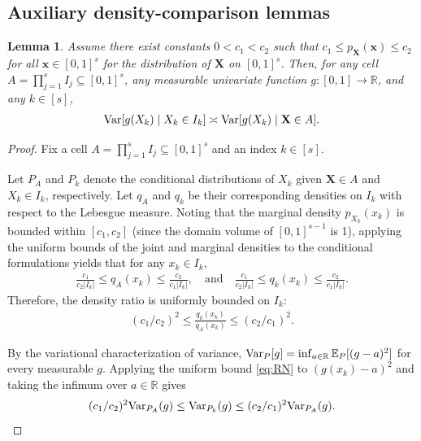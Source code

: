 \documentclass[11pt]{article}
\theoremstyle{plain}
\newtheorem{lemma}[theorem]{Lemma}
\theoremstyle{definition}
\theoremstyle{remark}
\theoremstyle{plain}
\newcommand{\bx}{\mathbf{x}}
\newcommand{\bX}{\mathbf{X}}
\DeclarePairedDelimiter{\bracks}{[}{]}
\newcommand{\E}{\mathbb{E}}
\newcommand{\Var}{\textnormal{Var}}
\newcommand{\1}{\mathbbm{1}}
\begin{document}
\subsection{Auxiliary density-comparison lemmas}

\begin{lemma}\label{lemma:equiv-proj-var}
    Assume there exist constants $0 < c_1 < c_2$ such that $c_1 \leq p_{\bX}(\bx) \leq c_2$ for all $\bx \in [0,1]^s$ for the distribution of $\bX$ on $[0,1]^s$.
    Then, for any cell $A = \prod_{j=1}^s I_j \subseteq [0,1]^s$, any measurable univariate function $g : [0,1] \to \mathbb{R}$, and any $k \in [s]$,
    \begin{equation}
    \begin{aligned}
        \Var\bracks*{g(X_k) \mid X_k \in I_k} \asymp \Var\bracks*{g(X_k) \mid \bX \in A}.
    \end{aligned}
    \end{equation}
\end{lemma}

\begin{proof}
    Fix a cell $A = \prod_{j=1}^s I_j \subseteq [0,1]^s$ and an index $k \in [s]$.

    Let $P_A$ and $P_k$ denote the conditional distributions of $X_k$ given $\bX \in A$ and $X_k \in I_k$, respectively. Let $q_A$ and $q_k$ be their corresponding densities on $I_k$ with respect to the Lebesgue measure. Noting that the marginal density $p_{X_k}(x_k)$ is bounded within $[c_1, c_2]$ (since the domain volume of $[0,1]^{s-1}$ is 1), applying the uniform bounds of the joint and marginal densities to the conditional formulations yields that for any $x_k \in I_k$,
    \begin{equation}
    \begin{aligned}
        \frac{c_1}{c_2 |I_k|} \leq q_A(x_k) \leq \frac{c_2}{c_1 |I_k|}, \quad \text{and} \quad \frac{c_1}{c_2 |I_k|} \leq q_k(x_k) \leq \frac{c_2}{c_1 |I_k|}.
    \end{aligned}
    \end{equation}
    Therefore, the density ratio is uniformly bounded on $I_k$:
    \begin{equation}\label{eq:RN}
    \begin{aligned}
        (c_1/c_2)^2 \leq \frac{q_k(x_k)}{q_A(x_k)} \leq (c_2/c_1)^2.
    \end{aligned}
    \end{equation}

    By the variational characterization of variance,
    $\Var_P[g]=\inf_{a\in\mathbb R}\E_P[(g-a)^2]$ for every measurable $g$.
    Applying the uniform bound \eqref{eq:RN} to $(g(x_k)-a)^2$ and taking the infimum over $a\in\mathbb R$ gives
    \begin{equation}
    \begin{aligned}
        (c_1/c_2)^2 \Var_{P_A}(g) \leq \Var_{P_k}(g) \leq (c_2/c_1)^2 \Var_{P_A}(g).
    \end{aligned}
    \end{equation}
\end{proof}
\end{document}
